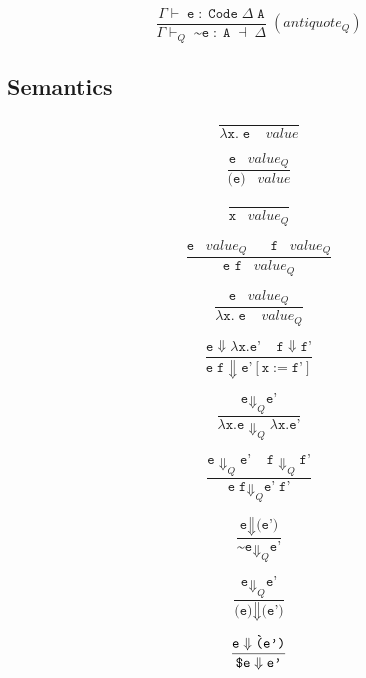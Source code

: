 \documentclass{article}
\begin{document}
$$
\frac
  {\Gamma \vdash \; \texttt{e} \; : \; \texttt{Code} \; \Delta \; \texttt{A}}
  {\Gamma \vdash_{Q} \; \texttt{\textasciitilde e} \; : \; \texttt{A} \; \dashv \; \Delta}
  \; (antiquote_Q)
$$

\subsection{Semantics}

$$
\frac{}{\lambda \texttt{x.} \; \texttt{e} \; \; \; \; value}
$$

$$
\frac{\texttt{e} \; \; \; value_{Q} }{\texttt{\`(e)} \; \; \; value}
$$

$$
\frac{}{\texttt{x} \; \; \; value_{Q}}
$$

$$
\frac{\texttt{e} \; \; \; value_{Q} \;\;\;\;\;\; \texttt{f} \;\;\; value_{Q}}{\texttt{e f} \; \; \; value_{Q}}
$$

$$
\frac{\texttt{e} \;\;\; value_{Q}}{\lambda \texttt{x.} \; \texttt{e} \; \; \; \; value_{Q}}
$$

$$
\frac
    {\texttt{e} \Downarrow \lambda \texttt{x.} \texttt{e'} \; \; \; \; \texttt{f} \Downarrow \texttt{f'}}
    {\texttt{e} \; \texttt{f} \Downarrow \texttt{e'}[\texttt{x} := \texttt{f'}]}
$$

$$
\frac
    {\texttt{e} \Downarrow_{Q} \texttt{e'}}
    {\lambda \texttt{x.} \texttt{e} \Downarrow_{Q} \lambda \texttt{x.} \texttt{e'}}
$$

$$
\frac
    {\texttt{e} \Downarrow_{Q} \texttt{e'} \;\;\;\; \texttt{f} \Downarrow_{Q} \texttt{f'}}
    {\texttt{e} \; \texttt{f} \Downarrow_{Q} \texttt{e'} \; \texttt{f'}}
$$

$$
\frac
    {\texttt{e} \Downarrow \texttt{\`(e')}}
    {\texttt{\textasciitilde} \texttt{e} \Downarrow_{Q} \texttt{e'}}
$$

$$
\frac
    {\texttt{e} \Downarrow_{Q} \texttt{e'}}
    {\texttt{\`(e)} \Downarrow \texttt{\`(e')}}
$$

$$
\frac
    {\texttt{e} \Downarrow \texttt{\`(e')}}
    {\texttt{\textdollar} \texttt{e} \Downarrow \texttt{e'}}
$$
\end{document}
